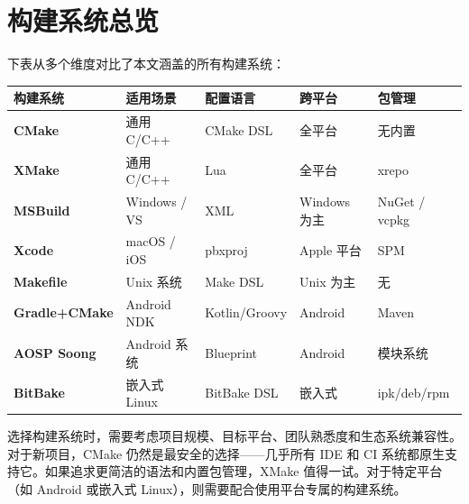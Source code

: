\documentclass[12pt,a4paper,fontset=fandol]{ctexbook}
\begin{document}
\backmatter

\chapter*{构建系统总览}

下表从多个维度对比了本文涵盖的所有构建系统：

{\small
\begin{longtable}{>{\bfseries}l p{2.5cm} p{2.5cm} p{2.5cm} p{2.5cm}}
\toprule
\textbf{构建系统} & \textbf{适用场景} & \textbf{配置语言} & \textbf{跨平台} & \textbf{包管理} \\
\midrule
CMake & 通用 C/C++ & CMake DSL & 全平台 & 无内置 \\
XMake & 通用 C/C++ & Lua & 全平台 & xrepo \\
MSBuild & Windows / VS & XML & Windows 为主 & NuGet / vcpkg \\
Xcode & macOS / iOS & pbxproj & Apple 平台 & SPM \\
Makefile & Unix 系统 & Make DSL & Unix 为主 & 无 \\
\midrule
Gradle+CMake & Android NDK & Kotlin/Groovy & Android & Maven \\
AOSP Soong & Android 系统 & Blueprint & Android & 模块系统 \\
BitBake & 嵌入式 Linux & BitBake DSL & 嵌入式 & ipk/deb/rpm \\
\bottomrule
\end{longtable}
}

选择构建系统时，需要考虑项目规模、目标平台、团队熟悉度和生态系统兼容性。对于新项目，CMake 仍然是最安全的选择——几乎所有 IDE 和 CI 系统都原生支持它。如果追求更简洁的语法和内置包管理，XMake 值得一试。对于特定平台（如 Android 或嵌入式 Linux），则需要配合使用平台专属的构建系统。
\end{document}
